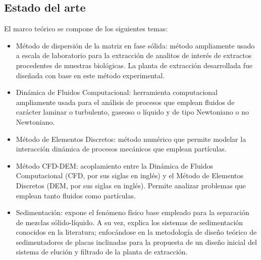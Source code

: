 \begin{center}
	\section{Estado del arte}
\end{center}

\noindent
\justify

El marco te\'orico se compone de los siguientes temas: 

\begin{itemize}
	\item M\'etodo de dispersi\'on de la matriz en fase s\'olida: m\'etodo ampliamente usado a escala de laboratorio para la extracci\'on de analitos de inter\'es de extractos procedentes de muestras biol\'ogicas. La planta de extracci\'on desarrollada fue dise\~nada con base en este m\'etodo experimental.
	\item Din\'amica de Fluidos Computacional: herramienta computacional ampliamente usada para el an\'alisis de procesos que emplean fluidos de car\'acter laminar o turbulento, gaseoso o l\'iquido y de tipo Newtoniano o no Newtoniano.
	\item M\'etodo de Elementos Discretos: m\'etodo num\'erico que permite modelar la interacci\'on din\'amica de procesos mec\'anicos que emplean part\'iculas. 
	\item M\'etodo CFD-DEM: acoplamiento entre la Din\'amica de Fluidos Computacional (CFD, por sus siglas en ingl\'es) y el M\'etodo de Elementos Discretos (DEM, por sus siglas en ingl\'es). Permite analizar problemas que emplean tanto fluidos como part\'iculas.
	\item Sedimentaci\'on: expone el fen\'omeno f\'isico base empleado para la separaci\'on de mezclas s\'olido-l\'iquido. A su vez, explica los sistemas de sedimentaci\'on conocidos en la literatura; enfoc\'andose en la metodolog\'ia de dise\~no te\'orico de sedimentadores de placas inclinadas para la propuesta de un dise\~no inicial del sistema de eluci\'on y filtrado de la planta de extracci\'on.
\end{itemize}










